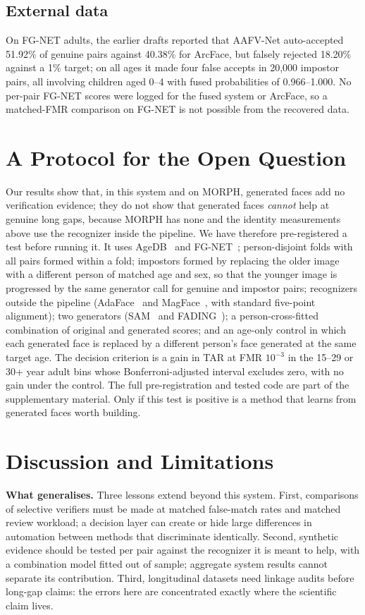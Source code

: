 \documentclass[journal]{IEEEtran}
\begin{document}
\subsection{External data}
On FG-NET adults, the earlier drafts reported that AAFV-Net auto-accepted 51.92\% of genuine pairs against 40.38\% for ArcFace, but falsely rejected 18.20\% against a 1\% target; on all ages it made four false accepts in 20,000 impostor pairs, all involving children aged 0--4 with fused probabilities of 0.966--1.000. No per-pair FG-NET scores were logged for the fused system or ArcFace, so a matched-FMR comparison on FG-NET is not possible from the recovered data.

\section{A Protocol for the Open Question}
\label{sec:protocol}
Our results show that, in this system and on MORPH, generated faces add no verification evidence; they do not show that generated faces \emph{cannot} help at genuine long gaps, because MORPH has none and the identity measurements above use the recognizer inside the pipeline. We have therefore pre-registered a test before running it. It uses AgeDB~\cite{moschoglou2017agedb} and FG-NET~\cite{lanitis2002fgnet}; person-disjoint folds with all pairs formed within a fold; impostors formed by replacing the older image with a different person of matched age and sex, so that the younger image is progressed by the same generator call for genuine and impostor pairs; recognizers outside the pipeline (AdaFace~\cite{kim2022adaface} and MagFace~\cite{meng2021magface}, with standard five-point alignment); two generators (SAM~\cite{alaluf2021sam} and FADING~\cite{chen2023fading}); a person-cross-fitted combination of original and generated scores; and an age-only control in which each generated face is replaced by a different person's face generated at the same target age. The decision criterion is a gain in TAR at FMR $10^{-3}$ in the 15--29 or 30+ year adult bins whose Bonferroni-adjusted interval excludes zero, with no gain under the control. The full pre-registration and tested code are part of the supplementary material. Only if this test is positive is a method that learns from generated faces worth building.

\section{Discussion and Limitations}
\textbf{What generalises.} Three lessons extend beyond this system. First, comparisons of selective verifiers must be made at matched false-match rates and matched review workload; a decision layer can create or hide large differences in automation between methods that discriminate identically. Second, synthetic evidence should be tested per pair against the recognizer it is meant to help, with a combination model fitted out of sample; aggregate system results cannot separate its contribution. Third, longitudinal datasets need linkage audits before long-gap claims: the errors here are concentrated exactly where the scientific claim lives.
\end{document}
